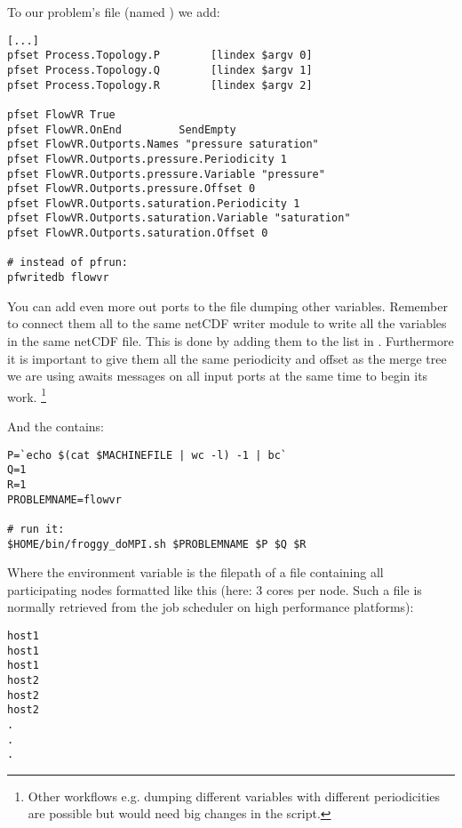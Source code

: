 To our problem's  file (named ) we add:
\begin{display}\begin{verbatim}
[...]
pfset Process.Topology.P        [lindex $argv 0]
pfset Process.Topology.Q        [lindex $argv 1]
pfset Process.Topology.R        [lindex $argv 2]

pfset FlowVR True
pfset FlowVR.OnEnd         SendEmpty
pfset FlowVR.Outports.Names "pressure saturation"
pfset FlowVR.Outports.pressure.Periodicity 1
pfset FlowVR.Outports.pressure.Variable "pressure"
pfset FlowVR.Outports.pressure.Offset 0
pfset FlowVR.Outports.saturation.Periodicity 1
pfset FlowVR.Outports.saturation.Variable "saturation"
pfset FlowVR.Outports.saturation.Offset 0

# instead of pfrun:
pfwritedb flowvr
\end{verbatim}\end{display}
You can add even more out ports to the  file dumping other variables. Remember
to connect them all to the same netCDF writer module to write all the variables in the same netCDF file.
This is done by adding them to the  list in . Furthermore it is important to
give them all the same periodicity and offset as the merge tree we are using awaits messages
on all input ports at the same time to begin its work.
\footnote{Other workflows e.g. dumping different variables with different periodicities
are possible but would need big changes in the  script.}

And the  contains:
\begin{display}\begin{verbatim}
P=`echo $(cat $MACHINEFILE | wc -l) -1 | bc`
Q=1
R=1
PROBLEMNAME=flowvr

# run it:
$HOME/bin/froggy_doMPI.sh $PROBLEMNAME $P $Q $R
\end{verbatim}\end{display}
Where the  environment variable is the filepath of a file containing
all participating nodes formatted like this (here: 3 cores per node. Such a file is
normally retrieved from the job scheduler on high performance platforms):
\begin{display}\begin{verbatim}
host1
host1
host1
host2
host2
host2
.
.
.
\end{verbatim}\end{display}

